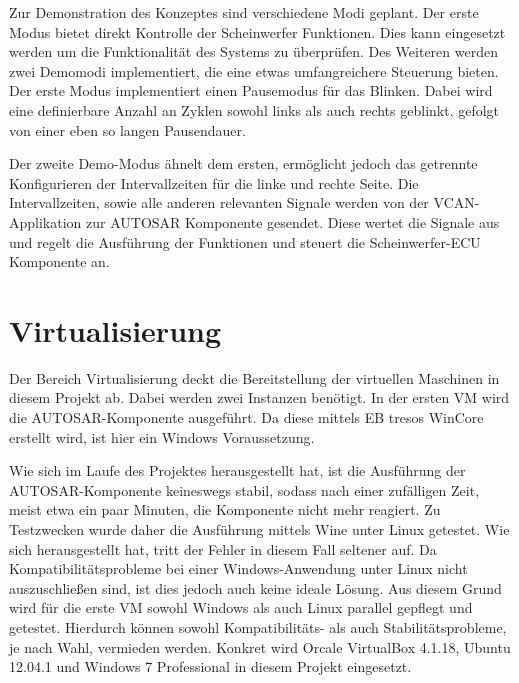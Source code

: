 \documentclass[
  a4paper,					    %
  twoside,
  DIV=calc,     				%
  bibliography=totoc,
  cleardoublepage=empty,
  ngerman,     					%
  final       					%
]{scrbook}
\begin{document}
Zur Demonstration des Konzeptes sind verschiedene Modi geplant. Der erste Modus bietet direkt Kontrolle der Scheinwerfer Funktionen. Dies kann eingesetzt werden um die Funktionalität des Systems zu überprüfen. Des Weiteren werden zwei Demomodi implementiert, die eine etwas umfangreichere Steuerung bieten. Der erste Modus implementiert einen Pausemodus für das Blinken. Dabei wird eine definierbare Anzahl an Zyklen sowohl links als auch rechts geblinkt, gefolgt von einer eben so langen Pausendauer.

Der zweite Demo-Modus ähnelt dem ersten, ermöglicht jedoch das getrennte Konfigurieren der Intervallzeiten für die linke und rechte Seite. Die Intervallzeiten, sowie alle anderen relevanten Signale werden von der VCAN-Applikation zur AUTOSAR Komponente gesendet. Diese wertet die Signale aus und regelt die Ausführung der Funktionen und steuert die Scheinwerfer-ECU Komponente an.




\section{Virtualisierung}
\label{sec:Virtualisierung_Umgesetzt}
Der Bereich Virtualisierung deckt die Bereitstellung der virtuellen Maschinen in diesem Projekt ab. Dabei werden zwei Instanzen benötigt. In der ersten VM wird die AUTOSAR-Komponente ausgeführt. Da diese mittels EB tresos WinCore erstellt wird, ist hier ein Windows Voraussetzung.

Wie sich im Laufe des Projektes herausgestellt hat, ist die Ausführung der AUTOSAR-Komponente keineswegs stabil, sodass nach einer zufälligen Zeit, meist etwa ein paar Minuten, die Komponente nicht mehr reagiert. Zu Testzwecken wurde daher die Ausführung mittels Wine unter Linux getestet. Wie sich herausgestellt hat, tritt der Fehler in diesem Fall seltener auf. Da Kompatibilitätsprobleme bei einer Windows-Anwendung unter Linux nicht auszuschließen sind, ist dies jedoch auch keine ideale Lösung. Aus diesem Grund wird für die erste VM sowohl Windows als auch Linux parallel gepflegt und getestet. Hierdurch können sowohl Kompatibilitäts- als auch Stabilitätsprobleme, je nach Wahl, vermieden werden. Konkret wird Orcale VirtualBox 4.1.18, Ubuntu 12.04.1 und Windows 7 Professional in diesem Projekt eingesetzt.
\end{document}
